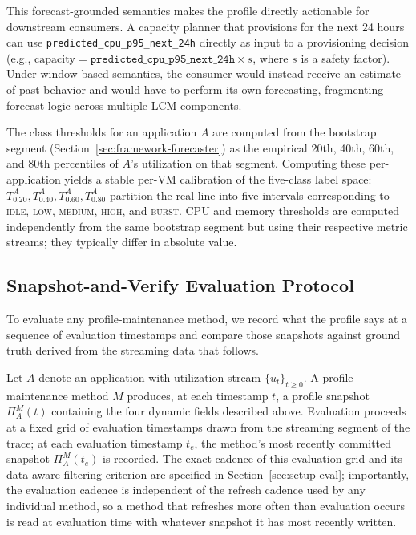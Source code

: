 \documentclass[manuscript,screen,review,anonymous]{acmart}
\begin{document}
This forecast-grounded semantics makes the profile directly
actionable for downstream consumers. A capacity planner that
provisions for the next 24 hours can use
\texttt{predicted\_cpu\_p95\_next\_24h} directly as input to a
provisioning decision (e.g., $\mathrm{capacity} =
\texttt{predicted\_cpu\_p95\_next\_24h} \times s$, where $s$ is
a safety factor). Under window-based semantics, the consumer
would instead receive an estimate of past behavior and would have
to perform its own forecasting, fragmenting forecast logic across
multiple LCM components.

The class thresholds for an application $A$ are computed from the
bootstrap segment (Section~\ref{sec:framework-forecaster}) as the
empirical 20th, 40th, 60th, and 80th percentiles of $A$'s
utilization on that segment. Computing these per-application
yields a stable per-VM calibration of the five-class label space:
$T_{0.20}^A, T_{0.40}^A, T_{0.60}^A, T_{0.80}^A$ partition the
real line into five intervals corresponding to \textsc{idle},
\textsc{low}, \textsc{medium}, \textsc{high}, and \textsc{burst}.
CPU and memory thresholds are computed independently from the same
bootstrap segment but using their respective metric streams; they
typically differ in absolute value.

\subsection{Snapshot-and-Verify Evaluation Protocol}\label{sec:framework-verify}

To evaluate any profile-maintenance method, we record what the
profile says at a sequence of evaluation timestamps and compare
those snapshots against ground truth derived from the streaming
data that follows.

Let $A$ denote an application with utilization stream
$\{u_t\}_{t \geq 0}$. A profile-maintenance method $M$ produces,
at each timestamp $t$, a profile snapshot $\Pi^M_A(t)$ containing
the four dynamic fields described above. Evaluation proceeds at a
fixed grid of evaluation timestamps drawn from the streaming
segment of the trace; at each evaluation timestamp $t_e$, the
method's most recently committed snapshot $\Pi^M_A(t_e)$ is
recorded. The exact cadence of this evaluation grid and its
data-aware filtering criterion are specified in
Section~\ref{sec:setup-eval}; importantly, the evaluation cadence
is independent of the refresh cadence used by any individual
method, so a method that refreshes more often than evaluation
occurs is read at evaluation time with whatever snapshot it has
most recently written.
\end{document}
